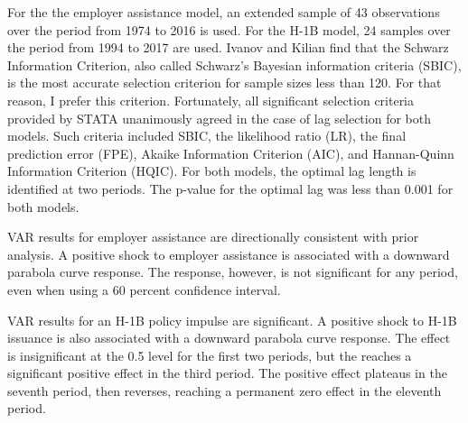 \documentclass[review]{elsarticle}
\begin{document}
    For the the employer assistance model,
    an extended sample of 43 observations
    over the period from 1974 to 2016 is used.
    For the H-1B model, 24 samples over the period from 1994 to 2017 are used.
    Ivanov and Kilian find that the Schwarz Information Criterion,
    also called Schwarz's Bayesian information criteria (SBIC),
    is the most accurate selection criterion for sample sizes less than 120\cite{ivanov2005practitioner}.
    For that reason, I prefer this criterion.
    Fortunately, all significant selection criteria provided by STATA unanimously agreed in the case of lag selection for both models.
    Such criteria included SBIC, the likelihood ratio (LR), the final prediction error (FPE),
    Akaike Information Criterion (AIC), and Hannan-Quinn Information Criterion (HQIC).
    For both models, the optimal lag length is identified at two periods.
    The p-value for the optimal lag was less than 0.001 for both models.
    
    VAR results for employer assistance are directionally consistent with prior analysis.
    A positive shock to employer assistance is associated with a downward parabola curve response.
    The response, however, is not significant for any period, even when using a 60 percent confidence interval.

    VAR results for an H-1B policy impulse are significant.
    A positive shock to H-1B issuance is also associated with a downward parabola curve response.
    The effect is insignificant at the 0.5 level for the first two periods,
    but the reaches a significant positive effect in the third period.
    The positive effect plateaus in the seventh period, then reverses,
    reaching a permanent zero effect in the eleventh period.
\end{document}
